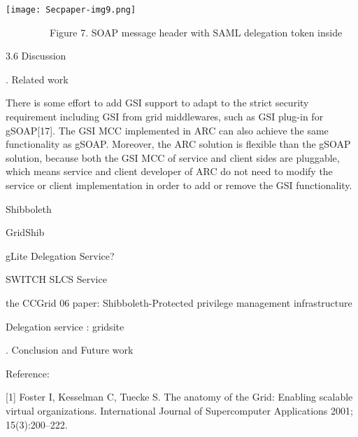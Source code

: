 \documentclass{article}
\begin{document}
\bigskip


\bigskip



\begin{center}
\texttt{[image: Secpaper-img9.png]}
\end{center}

\bigskip

{\centering
\ \ \ \ \ \ \ \ \ Figure 7. SOAP message header with SAML delegation
token inside
\par}


\bigskip


\bigskip

3.6 Discussion


\bigskip


\bigskip

{. Related work
\par}


\bigskip

There is some effort to add GSI support to adapt to the strict security
requirement including GSI from grid middlewares, such as GSI plug-in
for gSOAP[17]. The GSI MCC implemented in ARC can also achieve the same
functionality as gSOAP. Moreover, the ARC solution is flexible than the
gSOAP solution, because both the GSI MCC of service and client sides
are pluggable, which means service and client developer of ARC do not
need to modify the service or client implementation in order to add or
remove the GSI functionality.


\bigskip

Shibboleth

GridShib

gLite Delegation Service?

SWITCH SLCS Service

the CCGrid 06 paper: Shibboleth-Protected privilege management
infrastructure

Delegation service : gridsite


\bigskip


\bigskip

{. Conclusion and Future work
\par}


\bigskip


\bigskip

Reference:

[1] Foster I, Kesselman C, Tuecke S. The anatomy of the Grid: Enabling
scalable virtual organizations. International Journal of Supercomputer
Applications 2001; 15(3):200--222. 
\end{document}
